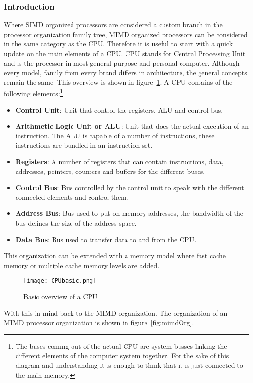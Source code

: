 \subsubsection{Introduction}
Where SIMD organized processors are considered a custom branch in the processor organization family tree, MIMD organized processors can be considered in the same category as the CPU.
Therefore it is useful to start with a quick update on the main elements of a CPU.
CPU stands for Central Processing Unit and is the processor in most general purpose and personal computer.
Although every model, family from every brand differs in architecture, the general concepts remain the same.
This overview is shown in figure~\ref{fig:cpub}. 
A CPU contains of the following elements:\footnote{The buses coming out of the actual CPU are system busses linking the different elements of the computer system together. For the sake of this diagram and understanding it is enough to think that it 	is just connected to the main memory. }
\begin{itemize}
	\item \textbf{Control Unit}: Unit that control the registers, ALU and control bus.
	\item \textbf{Arithmetic Logic Unit or ALU}: Unit that does the actual execution of an instruction. The ALU is capable of a number of instructions, these instructions are bundled in an instruction set.
	\item \textbf{Registers}: A number of registers that can contain instructions, data, addresses, pointers, counters and buffers for the different buses.
	\item \textbf{Control Bus}: Bus controlled by the control unit to speak with the different connected elements and control them.
	\item \textbf{Address Bus}: Bus used to put on memory addresses, the bandwidth of the bus defines the size of the address space.
	\item \textbf{Data Bus}: Bus used to transfer data to and from the CPU.
\end{itemize}
This organization can be extended with a memory model where fast cache memory or multiple cache memory levels are added.
\par 
\begin{figure}
	\centering
	\texttt{[image: CPUbasic.png]}
	\caption{Basic overview of a CPU}
	\label{fig:cpub}
\end{figure}
With this in mind back to the MIMD organization.
The organization of an MIMD processor organization is shown in figure~\ref{fig:mimdOrg}. 
